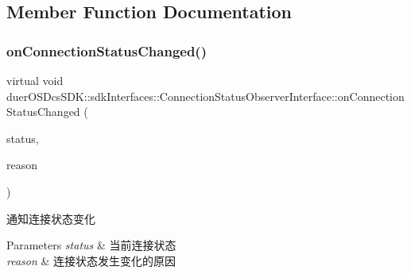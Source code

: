 \subsection{Member Function Documentation}
\mbox{\label{classduerOSDcsSDK_1_1sdkInterfaces_1_1ConnectionStatusObserverInterface_a5184e92a9c0c77dc28a751bc5612b5cc}} 
\subsubsection{\texorpdfstring{on\+Connection\+Status\+Changed()}{onConnectionStatusChanged()}}
{\footnotesize\ttfamily virtual void duer\+O\+S\+Dcs\+S\+D\+K\+::sdk\+Interfaces\+::\+Connection\+Status\+Observer\+Interface\+::on\+Connection\+Status\+Changed (\begin{DoxyParamCaption}\item[{const \hyperlink{classduerOSDcsSDK_1_1sdkInterfaces_1_1ConnectionStatusObserverInterface_a3e9317c341d07a60d5c5f321495d0b4f}{Status}}]{status,  }\item[{const \hyperlink{classduerOSDcsSDK_1_1sdkInterfaces_1_1ConnectionStatusObserverInterface_a532c8f67d5315b6f0bdef01752463a38}{Changed\+Reason}}]{reason }\end{DoxyParamCaption})\hspace{0.3cm}{\ttfamily [pure virtual]}}



通知连接状态变化 


\begin{DoxyParams}{Parameters}
{\em status} & 当前连接状态 \\
\hline
{\em reason} & 连接状态发生变化的原因 \\
\hline
\end{DoxyParams}
